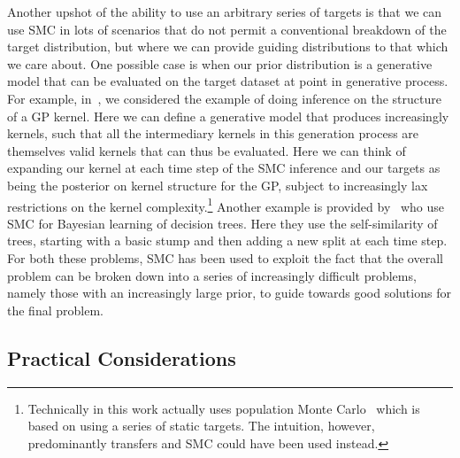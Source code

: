 Another upshot of the ability to use an arbitrary series of targets is that we can use SMC in lots of scenarios that do not
permit a conventional breakdown of the target distribution, but where we 
can provide guiding distributions to that which we care about.  One possible case is when our prior distribution
is a generative model that can be evaluated on the target dataset at point in generative process.
For example, in~\cite{janz2016probstruct}, we considered the example of doing inference
on the structure of a GP kernel.  Here we can define a generative model that produces
increasingly kernels, such that all the intermediary kernels in this generation process are themselves
valid kernels that can thus be evaluated.  Here we can think of expanding our kernel at each time step of 
the SMC inference and our targets as being the posterior on kernel structure for the GP, subject to increasingly
lax restrictions on the kernel complexity.\footnote{Technically in this work actually uses population
	Monte Carlo~\cite{cappe2004population} which is based on using a series of static targets.  The
	intuition, however, predominantly transfers and SMC could have been used instead.}  
Another example is provided by~\cite{lakshminarayanan2013top}
who use SMC for Bayesian learning of decision trees.  Here they use the self-similarity of trees, starting
with a basic stump and then adding a new split at each time step.
For both these problems, SMC has been used
to exploit the fact that the overall problem can be broken down into a series of increasingly difficult
problems, namely those with an increasingly large prior, to guide towards good solutions for the final problem.

\subsection{Practical Considerations}
\label{sec:part:smc:prat}

